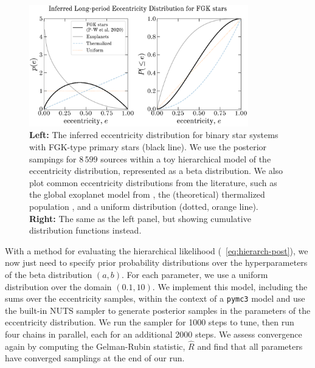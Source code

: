 \documentclass[modern]{aastex63}
\begin{document}
\begin{figure}[!t]
    \begin{center}
    \includegraphics[width=0.85\textwidth]{eccentricity-distr.pdf}
    \end{center}
    \caption{%
    \textbf{Left:} The inferred eccentricity distribution for binary star
    systems with FGK-type primary stars (black line).
    We use the posterior sampings for $8\,599$ sources within a toy hierarchical
    model of the eccentricity distribution, represented as a beta distribution.
    We also plot common eccentricity distributions from the literature, such as
    the global exoplanet model from \cite[][; solid, gray line]{Kipping:2013},
    the (theoretical) thermalized population \citep[][; dashed, blue
    line]{Jeans:1919}, and a uniform distribution (dotted, orange line).
    \textbf{Right:} The same as the left panel, but showing cumulative
    distribution functions instead.
    \label{fig:eccdist}
    }
\end{figure}

With a method for evaluating the hierarchical likelihood
(\equationname~\ref{eq:hierarch-post}), we now just need to specify prior
probability distributions over the hyperparameters of the beta distribution $(a,
b)$.
For each parameter, we use a uniform distribution over the domain $(0.1, 10)$.
We implement this model, including the sums over the eccentricity samples,
within the context of a \texttt{pymc3} model and use the built-in NUTS sampler
to generate posterior samples in the parameters of the eccentricity
distribution.
We run the sampler for 1000 steps to tune, then run four chains in parallel,
each for an additional 2000 steps.
We assess convergence again by computing the Gelman-Rubin statistic, $\hat{R}$
and find that all parameters have converged samplings at the end of our run.
\end{document}
